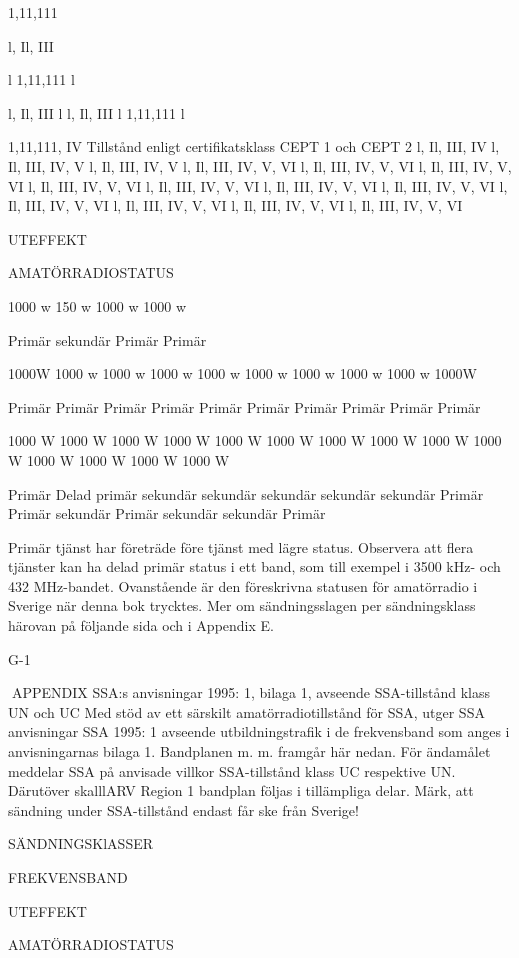 \documentclass[a4paper,twoside,twocolumn,openright]{book}
\begin{document}
{{{{{{{{{{{1,11,111

l, Il, III

l
1,11,111
l

l, Il, III
l
l, Il, III
l
1,11,111
l

1,11,111, IV
Tillstånd enligt
certifikatsklass
CEPT 1 och CEPT 2
l, Il, III, IV
l, Il, III, IV, V
l, Il, III, IV, V
l, Il, III, IV, V, VI
l, Il, III, IV, V, VI
l, Il, III, IV, V, VI
l, Il, III, IV, V, VI
l, Il, III, IV, V, VI
l, Il, III, IV, V, VI
l, Il, III, IV, V, VI
l, Il, III, IV, V, VI
l, Il, III, IV, V, VI
l, Il, III, IV, V, VI
l, Il, III, IV, V, VI

UTEFFEKT

AMATÖRRADIOSTATUS

1000 w
150 w
1000 w
1000 w

Primär
sekundär
Primär
Primär

1000W
1000 w
1000 w
1000 w
1000 w
1000 w
1000 w
1000 w
1000 w
1000W

Primär
Primär
Primär
Primär
Primär
Primär
Primär
Primär
Primär
Primär

1000 W
1000 W
1000 W
1000 W
1000 W
1000 W
1000 W
1000 W
1000 W
1000 W
1000 W
1000 W
1000 W
1000 W

Primär
Delad primär
sekundär
sekundär
sekundär
sekundär
sekundär
Primär
Primär
sekundär
Primär
sekundär
sekundär
Primär

Primär tjänst har företräde före tjänst med lägre status. Observera att flera tjänster kan ha
delad primär status i ett band, som till exempel i 3500 kHz- och 432 MHz-bandet.
Ovanstående är den föreskrivna statusen för amatörradio i Sverige när denna bok trycktes.
Mer om sändningsslagen per sändningsklass härovan på följande sida och i Appendix E.

G-1

APPENDIX
SSA:s anvisningar 1995: 1, bilaga 1, avseende SSA-tillstånd klass UN och UC
Med stöd av ett särskilt amatörradiotillstånd för SSA, utger SSA anvisningar SSA 1995: 1
avseende utbildningstrafik i de frekvensband som anges i anvisningarnas bilaga 1. Bandplanen m. m. framgår här nedan.
För ändamålet meddelar SSA på anvisade villkor SSA-tillstånd klass UC respektive UN.
Därutöver skalllARV Region 1 bandplan följas i tillämpliga delar.
Märk, att sändning under SSA-tillstånd endast får ske från Sverige!

SÄNDNINGSKlASSER

FREKVENSBAND

UTEFFEKT

AMATÖRRADIOSTATUS

}}}}}}}}}}}
\end{document}

